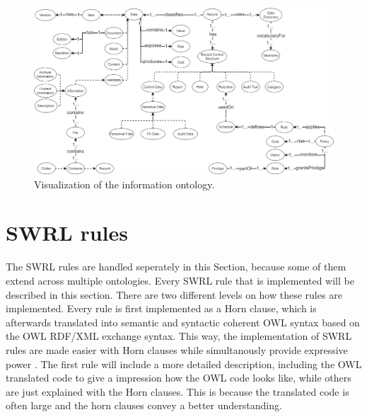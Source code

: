\documentclass[
  a4paper,  %
  twoside,  %
  bibliography=totoc,
  headsepline,
  cleardoublepage=empty,
  parskip=half,
  draft=false
]{scrbook}
\begin{document}
\begin{figure}[h]
  \centering
  \includegraphics[width=\textwidth]{graphics/information.drawio.png}
  \caption{Visualization of the information ontology.}
  \label{fig:information}
\end{figure}

\section{\acrlong{SWRL} rules} \label{sec:SWRL}

The \acrshort{SWRL} rules are handled seperately in this Section, because some of them extend across multiple ontologies. Every \acrshort{SWRL} rule that is implemented will be described in this section. There are two different levels on how these rules are implemented. Every rule is first implemented as a Horn clause, which is afterwards translated into semantic and syntactic coherent OWL syntax based on the OWL RDF/XML exchange syntax. This way, the implementation of SWRL rules are made easier with Horn clauses while simultanously provide expressive power \cite{Horrocks2005OWL}. The first rule will include a more detailed description, including the OWL translated code to give a impression how the OWL code looks like, while others are just explained with the Horn clauses. This is because the translated code is often large and the horn clauses convey a better understanding. \\
\end{document}
